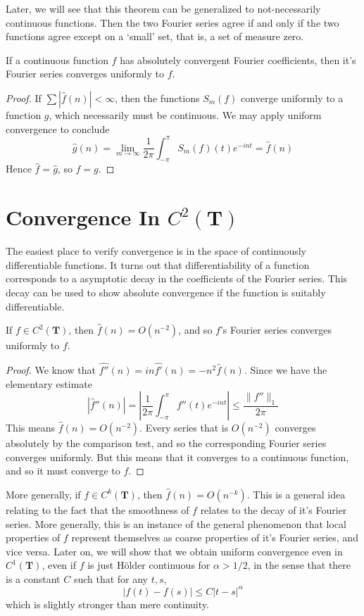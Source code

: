Later, we will see that this theorem can be generalized to not-necessarily continuous functions. Then the two Fourier series agree if and only if the two functions agree except on a `small' set, that is, a set of measure zero.

\begin{corollary}
    If a continuous function $f$ has absolutely convergent Fourier coefficients, then it's Fourier series converges uniformly to $f$.
\end{corollary}
\begin{proof}
    If $\sum |\widehat{f}(n)| < \infty$, then the functions $S_m(f)$ converge uniformly to a function $g$, which necessarily must be continuous. We may apply uniform convergence to conclude
    \[ \widehat{g}(n) = \lim_{m \to \infty} \frac{1}{2\pi} \int_{-\pi}^\pi S_m(f)(t) e^{-int} = \widehat{f}(n) \]
    Hence $\widehat{f} = \widehat{g}$, so $f = g$.
\end{proof}

\section{Convergence In $C^2(\mathbf{T})$}

The easiest place to verify convergence is in the space of continuously differentiable functions. It turns out that differentiability of a function corresponds to a asymptotic decay in the coefficients of the Fourier series. This decay can be used to show absolute convergence if the function is suitably differentiable.

\begin{theorem}
    If $f \in C^2(\mathbf{T})$, then $\widehat{f}(n) = O(n^{-2})$, and so $f$'s Fourier series converges uniformly to $f$.
\end{theorem}
\begin{proof}
    We know that $\widehat{f''}(n) = in \widehat{f'}(n) = -n^2 \widehat{f}(n)$. Since we have the elementary estimate
    \[ |\widehat{f}''(n)| = \left| \frac{1}{2\pi} \int_{-\pi}^\pi f''(t) e^{-int} \right| \leq \frac{\| f'' \|_1}{2\pi} \]
    This means $\widehat{f}(n) = O(n^{-2})$. Every series that is $O(n^{-2})$ converges absolutely by the comparison test, and so the corresponding Fourier series converges uniformly. But this means that it converges to a continuous function, and so it must converge to $f$.
\end{proof}

More generally, if $f \in C^k(\mathbf{T})$, then $\widehat{f}(n) = O(n^{-k})$. This is a general idea relating to the fact that the smoothness of $f$ relates to the decay of it's Fourier series. More generally, this is an instance of the general phenomenon that local properties of $f$ represent themselves as coarse properties of it's Fourier series, and vice versa. Later on, we will show that we obtain uniform convergence even in $C^1(\mathbf{T})$, even if $f$ is just H\"{o}lder continuous for $\alpha > 1/2$, in the sense that there is a constant $C$ such that for any $t,s$,
%
\[ |f(t) - f(s)| \leq C|t - s|^\alpha \]
%
which is slightly stronger than mere continuity.

